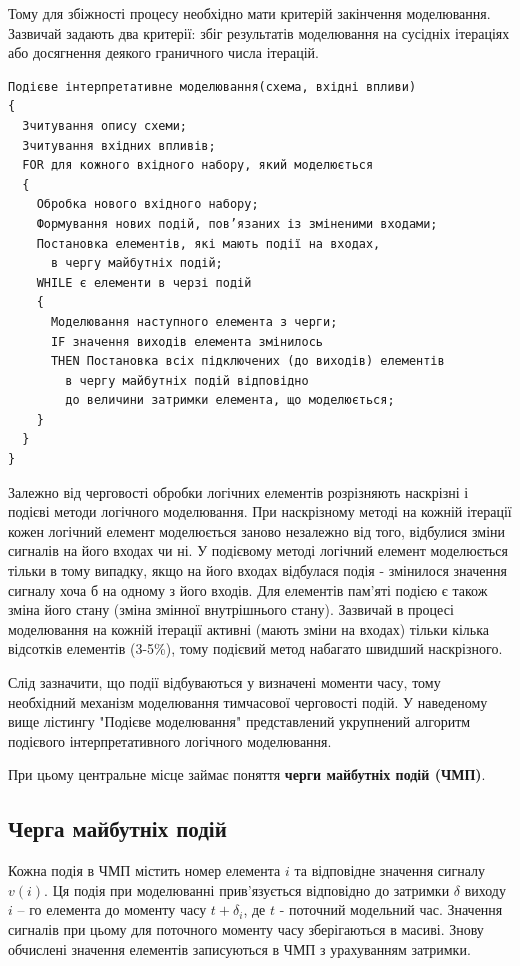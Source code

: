 \documentclass[12pt,a4paper]{article}
\begin{document}
Тому для збіжності процесу необхідно мати критерій закінчення моделювання. Зазвичай задають два критерії: збіг результатів моделювання на сусідніх ітераціях або досягнення деякого граничного числа ітерацій.

\small\begin{verbatim}
Подієве інтерпретативне моделювання(схема, вхідні впливи)
{
  Зчитування опису схеми;
  Зчитування вхідних впливів;
  FOR для кожного вхідного набору, який моделюється
  {
    Обробка нового вхідного набору;
    Формування нових подій, пов’язаних із зміненими входами;
    Постановка елементів, які мають події на входах,
      в чергу майбутніх подій;
    WHILE є елементи в черзі подій
    {
      Моделювання наступного елемента з черги;
      IF значення виходів елемента змінилось
      THEN Постановка всіх підключених (до виходів) елементів
        в чергу майбутніх подій відповідно
        до величини затримки елемента, що моделюється;
    }
  }
}
\end{verbatim}\normalsize

Залежно від черговості обробки логічних елементів розрізняють наскрізні і подієві методи логічного моделювання. При наскрізному методі на кожній ітерації кожен логічний елемент моделюється заново незалежно від того, відбулися зміни сигналів на його входах чи ні. У подієвому методі логічний елемент моделюється тільки в тому випадку, якщо на його входах відбулася подія - змінилося значення сигналу хоча б на одному з його входів. Для елементів пам'яті подією є також зміна його стану (зміна змінної внутрішнього стану). Зазвичай в процесі моделювання на кожній ітерації активні (мають зміни на входах) тільки кілька відсотків елементів (3-5\%), тому подієвий метод набагато швидший наскрізного.

Слід зазначити, що події відбуваються у визначені моменти часу, тому необхідний механізм моделювання тимчасової черговості подій. У наведеному вище лістингу "Подієве моделювання" представлений укрупнений алгоритм подієвого інтерпретативного логічного моделювання.

При цьому центральне місце займає поняття \textbf{черги майбутніх подій (ЧМП)}.

\subsection{Черга майбутніх подій}

Кожна подія в ЧМП містить номер елемента $i$ та відповідне значення сигналу $v(i)$. Ця подія при моделюванні прив'язується відповідно до затримки $\delta$ виходу $i$ -- го елемента до моменту часу $t+\delta_i$, де $t$ - поточний модельний час. Значення сигналів при цьому для поточного моменту часу зберігаються в масиві. Знову обчислені значення елементів записуються в ЧМП з урахуванням затримки.
\end{document}
